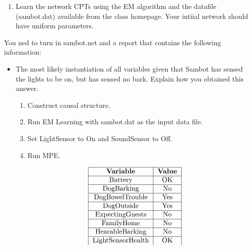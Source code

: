\documentclass[10.5pt,letterpaper]{article}
\begin{document}
\begin{enumerate}[label=\textbf{Problem \arabic*.}]
\begin{enumerate}[label=(\alph*)]
	\item Learn the network CPTs using the EM algorithm and the datafile (sambot.dat) available from the class homepage. Your intiial network should have uniform parameters.
	\end{enumerate}
You ned to turn in sambot.net and a report that contains the following information:
	\begin{itemize}
		\item The most likely instantiation of all variables given that Sambot has sensed the lights to be on, but has sensed no bark. Explain how you obtained this answer.
		\begin{enumerate}[label=\arabic*.]
			\item Construct causal structure.
			\item Run EM Learning with sambot.dat as the input data file.
			\item Set LightSensor to On and SoundSensor to Off.
			\item Run MPE.
		\end{enumerate}
		\[\begin{tabular} {|c|c|}
		\hline
		\textbf{Variable} & \textbf{Value} \\
		\hline
		Battery & OK \\
		\hline 
		DogBarking & No \\
		\hline
		DogBowelTrouble & Yes \\
		\hline
		DogOutside & Yes \\
		\hline
		ExpectingGuests & No \\
		\hline
		FamilyHome & No \\
		\hline
		HearableBarking & No \\
		\hline
		LightSensorHealth & OK \\

\end{tabular}\]
\end{itemize}
\end{enumerate}
\end{document}

